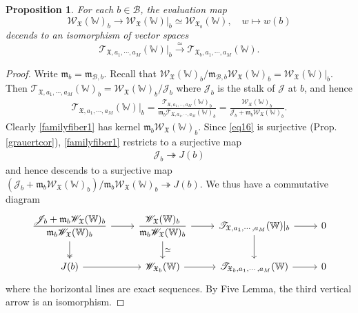 \documentclass[11pt,b5paper,notitlepage]{article}
\theoremstyle{definition}
\theoremstyle{plain}
\newtheorem{pp}[df]{Proposition}
\newcommand{\fk}{\mathfrak}
\newcommand{\mc}{\mathcal}
\newcommand{\scr}{\mathscr}
\newcommand{\Wbb}{\mathbb W}
\newcommand{\<}{\left\langle}
\renewcommand{\>}{\right\rangle}
\newcommand{\MB}{\mathcal{B}}
\newcommand{\fx}{\mathfrak{X}}
\newcommand{\ST}{\mathscr{T}}
\newcommand{\SW}{\mathscr{W}}
\newcommand{\mk}{\mathfrak m}
\numberwithin{equation}{subsection}
\begin{document}
\begin{pp}
    For each $b\in \MB$, the evaluation map
    \begin{equation}\label{familyfiber1}
        \SW_\fx(\Wbb)_b\rightarrow \SW_{\fk X}(\Wbb)|_b\simeq\SW_{\fx_b}(\Wbb),\quad w\mapsto w(b)
    \end{equation}
    decends to an isomorphism of vector spaces
    $$
    \ST_{\fx,a_1,\cdots,a_M}(\Wbb)\vert_b \xrightarrow{\simeq} \ST_{\fx_b,a_1,\cdots,a_M}(\Wbb).
    $$
\end{pp}
\begin{proof}
Write $\mk_b=\mk_{\mc B,b}$. Recall that $\scr W_{\fk X}(\Wbb)_b/\fk m_{\mc B,b}\scr W_{\fk X}(\Wbb)_b=\scr W_{\fk X}(\Wbb)|_b$. Then $\ST_{\fx,a_1,\cdots,a_M}(\Wbb)_b=\scr W_{\fk X}(\Wbb)_b/\scr J_b$ where $\scr J_b$ is the stalk of $\scr J$ at $b$, and hence 
\begin{align*}
\ST_{\fx,a_1,\cdots,a_M}(\Wbb)|_b=\frac{\ST_{\fx,a_1,\cdots,a_M}(\Wbb)_b}{\mk_b\ST_{\fx,a_1,\cdots,a_M}(\Wbb)_b}=\frac{\scr W_{\fk X}(\Wbb)_b}{\scr J_b+\fk m_b\scr W_{\fk X}(\Wbb)_b}.
\end{align*}
Clearly \eqref{familyfiber1} has kernel $\mk_b\scr W_{\fk X}(\Wbb)_b$. Since \eqref{eq16} is surjective (Prop. \ref{grauertcor}),  \eqref{familyfiber1} restricts to a surjective map 
\begin{gather}
\scr J_b\twoheadrightarrow J(b)  \label{eq17}
\end{gather}
and hence descends to a surjective map $(\scr J_b+\mk_b\scr W_{\fk X}(\Wbb)_b)/\mk_b\scr W_{\fk X}(\Wbb)_b\twoheadrightarrow J(b)$. We thus have a commutative diagram
\begin{equation*}
\begin{tikzcd}
\displaystyle\frac{\scr J_b+\mk_b\scr W_{\fk X}(\Wbb)_b}{\mk_b\scr W_{\fk X}(\Wbb)_b} \arrow[d, two heads] \arrow[r] & \displaystyle \frac{\scr W_{\fk X}(\Wbb)_b}{\mk_b\scr W_{\fk X}(\Wbb)_b}  \arrow[r] \arrow[d,"\simeq"] & \ST_{\fx,a_1,\cdots,a_M}(\Wbb)|_b \arrow[r] \arrow[d] & 0 \\
J(b) \arrow[r]                      & \scr W_{\fk X_b}(\Wbb) \arrow[r]           & \ST_{\fx_b,a_1,\cdots,a_M}(\Wbb) \arrow[r]           & 0
\end{tikzcd}
\end{equation*}
where the horizontal lines are exact sequences. By Five Lemma, the third vertical arrow is an isomorphism.
\end{proof}
\end{document}
